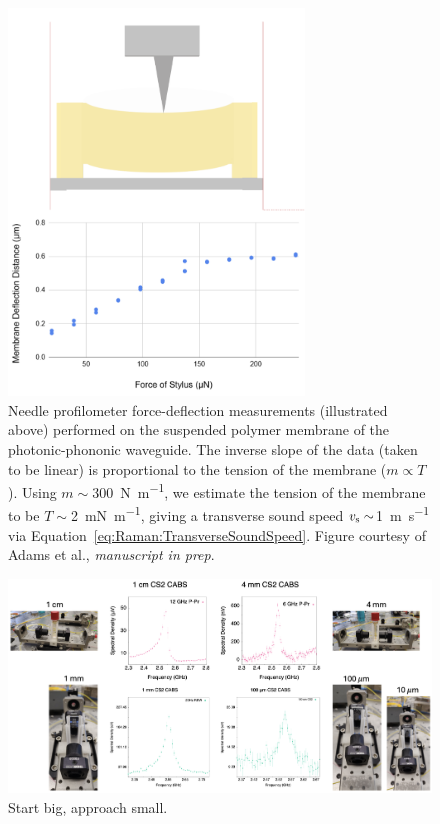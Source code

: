 \begin{figure}[t]
  \centering
  \includegraphics[width=0.7\textwidth]{figs/4-Raman/profilometer.png}
  \caption{Needle profilometer force-deflection measurements (illustrated above) performed on the suspended polymer membrane of the photonic-phononic waveguide. The inverse slope of the data (taken to be linear) is proportional to the tension of the membrane (\(m\propto T\)). Using \(m\sim\)\SI{300}{\newton\per\meter}, we estimate the tension of the membrane to be \(T\sim\)\SI{2}{\milli\newton\per\meter}, giving a transverse sound speed \(v_{\rm s}\sim\)\SI{1}{\meter\per\second} via Equation~\ref{eq:Raman:TransverseSoundSpeed}. Figure courtesy of Adams et al., \textit{manuscript in prep}.}
  \label{fig:Raman:profilometer}
\end{figure}

\begin{figure}[t]
  \centering
  \includegraphics[width=\textwidth]{figs/4-Raman/StartBigApproachSmall.png}
  \caption{Start big, approach small.}
  \label{fig:StartBigApproachSmall}
\end{figure}

